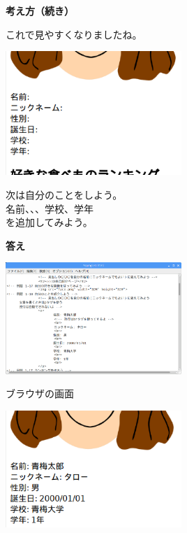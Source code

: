 \documentclass[a4paper,12pt]{jarticle}
\begin{document}
\clearpage
\flushleft

\textbf{考え方（続き）}


これで見やすくなりましたね。

\bigskip


\includegraphics[width=0.5\textwidth]{textbook-img176.png}

\bigskip

次は自分のことをしよう。\\
名前、、、学校、学年\\
を追加してみよう。



\bigskip

\bigskip


\textbf{答え}


\bigskip

\includegraphics[width=0.5\textwidth]{textbook-img177.png}



\bigskip

\bigskip



ブラウザの画面

\includegraphics[width=0.5\textwidth]{textbook-img173.png}
\end{document}

